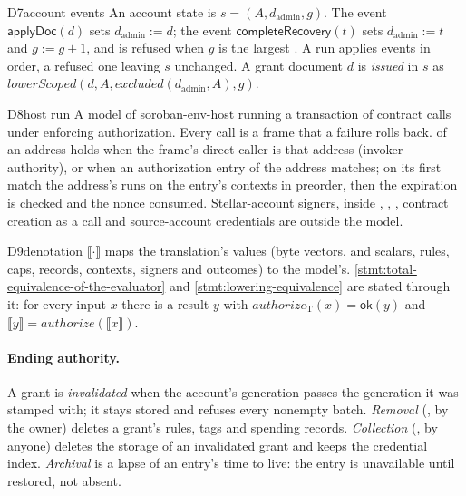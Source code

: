 \begin{perchdefinition}{D7}{account events}\label{def:d7}
An account state is $s = (A, d_{\mathrm{admin}}, g)$. The event
$\mathsf{applyDoc}(d)$ sets $d_{\mathrm{admin}} := d$; the event
$\mathsf{completeRecovery}(t)$ sets $d_{\mathrm{admin}} := t$ and $g := g + 1$,
and is refused when $g$ is the largest . A run applies events in
order, a refused one leaving $s$ unchanged. A grant document $d$ is
\emph{issued} in $s$ as $\mathit{lowerScoped}(d, A,
\mathit{excluded}(d_{\mathrm{admin}}, A), g)$.
\end{perchdefinition}

\begin{perchdefinition}{D8}{host run}\label{def:d8}
A model of soroban-env-host running a transaction of contract calls under
enforcing authorization. Every call is a frame that a failure rolls back.
 of an address holds when the frame's direct caller is that
address (invoker authority), or when an authorization entry of the address
matches; on its first match the address's  runs on the
entry's contexts in preorder, then the expiration is checked and the nonce
consumed. Stellar-account signers,  inside
, ,
, contract creation as a call and
source-account credentials are outside the model.
\end{perchdefinition}

\begin{perchdefinition}{D9}{denotation}\label{def:d9}
$\llbracket\cdot\rrbracket$ maps the translation's values (byte vectors,
 and  scalars, rules, caps, records, contexts, signers and
outcomes) to the model's. \ref{stmt:total-equivalence-of-the-evaluator} and
\ref{stmt:lowering-equivalence} are stated through it: for every input $x$ there
is a result $y$ with $\mathit{authorize}_{\mathrm{T}}(x) = \mathsf{ok}(y)$ and
$\llbracket y\rrbracket = \mathit{authorize}(\llbracket x\rrbracket)$.
\end{perchdefinition}

\paragraph{Ending authority.} A grant is \emph{invalidated} when the account's
generation passes the generation it was stamped with; it stays stored and refuses
every nonempty batch. \emph{Removal} (, by the owner) deletes
a grant's rules, tags and spending records. \emph{Collection}
(, by anyone) deletes the storage of an invalidated grant and
keeps the credential index. \emph{Archival} is a lapse of an entry's time to
live: the entry is unavailable until restored, not absent.


